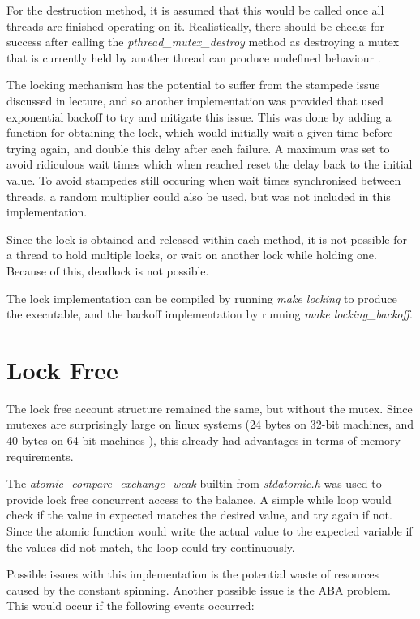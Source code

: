 \documentclass[12pt]{article}
\begin{document}
For the destruction method, it is assumed that this would be called once all threads are finished operating on it. Realistically, there should be checks for success after calling the \emph{pthread\_mutex\_destroy} method as destroying a mutex that is currently held by another thread can produce undefined behaviour \cite{mutexUndefined}.

The locking mechanism has the potential to suffer from the stampede issue discussed in lecture, and so another implementation was provided that used exponential backoff to try and mitigate this issue. This was done by adding a function for obtaining the lock, which would initially wait a given time before trying again, and double this delay after each failure. A maximum was set to avoid ridiculous wait times which when reached reset the delay back to the initial value. To avoid stampedes still occuring when wait times synchronised between threads, a random multiplier could also be used, but was not included in this implementation.

Since the lock is obtained and released within each method, it is not possible for a thread to hold multiple locks, or wait on another lock while holding one. Because of this, deadlock is not possible. 

The lock implementation can be compiled by running \emph{make locking} to produce the executable, and the backoff implementation by running \emph{make locking\_backoff}. 

\part{Lock Free}

The lock free account structure remained the same, but without the mutex. Since mutexes are surprisingly large on linux systems (24 bytes on 32-bit machines, and 40 bytes on 64-bit machines \cite{mutexSize}), this already had advantages in terms of memory requirements. 

The \emph{atomic\_compare\_exchange\_weak} builtin from \emph{stdatomic.h} was used to provide lock free concurrent access to the balance. A simple while loop would check if the value in expected matches the desired value, and try again if not. Since the atomic function would write the actual value to the expected variable if the values did not match, the loop could try continuously.

Possible issues with this implementation is the potential waste of resources caused by the constant spinning. Another possible issue is the ABA problem. This would occur if the following events occurred: 
\end{document}
